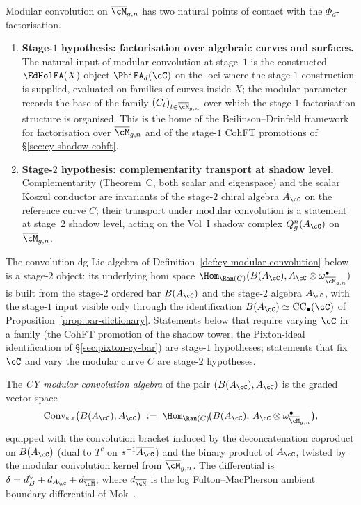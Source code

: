\begin{remark}
\label{rem:modular-conv-two-stages}
Modular convolution on $\overline{\cM}_{g,n}$ has two natural points of
contact with the $\Phi_d$-factorisation.
\begin{enumerate}[label=\textup{(\roman*)}]
\item \textbf{Stage-$1$ hypothesis: factorisation over algebraic curves
and surfaces.} The natural input of modular convolution at stage~$1$ is
the constructed $\EdHolFA(X)$ object $\PhiFA_d(\cC)$ on the loci where
the stage-$1$ construction is supplied, evaluated on families of curves inside
$X$; the modular parameter records the base of the family
$(C_t)_{t \in \overline{\cM}_{g,n}}$ over which the stage-$1$
factorisation structure is organised. This is the home of the
Beilinson--Drinfeld framework for factorisation over $\overline{\cM}_{g,n}$
and of the stage-$1$ CohFT promotions of
\S\ref{sec:cy-shadow-cohft}.
\item \textbf{Stage-$2$ hypothesis: complementarity transport at shadow
level.} Complementarity (Theorem~C, both scalar and eigenspace) and the
scalar Koszul conductor are invariants of the stage-$2$ chiral algebra
$A_\cC$ on the reference curve $C$; their transport under modular
convolution is a statement at stage~$2$ shadow level, acting on the Vol~I
shadow complex $Q_g^n(A_\cC)$ on $\overline{\cM}_{g,n}$.
\end{enumerate}
The convolution dg Lie algebra of
Definition~\ref{def:cy-modular-convolution} below is a stage-$2$ object:
its underlying hom space $\Hom_{\Ran(C)}(B(A_\cC), A_\cC \otimes \omega^\bullet_{\overline{\cM}_{g,n}})$
is built from the stage-$2$ ordered bar $B(A_\cC)$ and the stage-$2$
algebra $A_\cC$, with the stage-$1$ input visible only through the
identification $B(A_\cC) \simeq \mathrm{CC}_\bullet(\cC)$ of
Proposition~\ref{prop:bar-dictionary}. Statements below that require
varying $\cC$ in a family (the CohFT promotion of the shadow tower, the
Pixton-ideal identification of \S\ref{sec:pixton-cy-bar}) are
stage-$1$ hypotheses; statements that fix $\cC$ and vary the modular
curve $C$ are stage-$2$ hypotheses.
\end{remark}

\begin{definition}
\label{def:cy-modular-convolution}
The \emph{CY modular convolution algebra} of the pair $(B(A_\cC), A_\cC)$ is the graded vector space
\[
 \mathrm{Conv}_{\mathrm{str}}\bigl(B(A_\cC), A_\cC\bigr)
 \;:=\; \Hom_{\Ran(C)}\!\bigl(B(A_\cC),\, A_\cC \otimes \omega^{\bullet}_{\overline{\cM}_{g,n}}\bigr),
\]
equipped with the convolution bracket induced by the deconcatenation coproduct on $B(A_\cC)$ (dual to $T^c$ on $s^{-1}\overline{A_\cC}$) and the binary product of $A_\cC$, twisted by the modular convolution kernel from $\overline{\cM}_{g,n}$. The differential is $\delta = d_B^\vee + d_{A_\cC} + d_{\overline{\cM}}$, where $d_{\overline{\cM}}$ is the log Fulton--MacPherson ambient boundary differential of Mok~\cite{Mok25}.
\end{definition}

